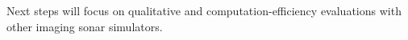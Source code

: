 \documentclass[final,5p,times]{elsarticle}
\begin{document}
Next steps will focus on qualitative and computation-efficiency evaluations with other imaging sonar simulators.




%










\end{document}
